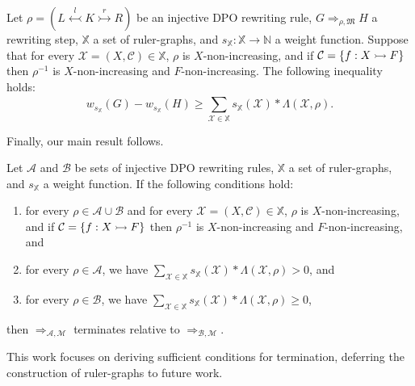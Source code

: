 \begin{lemma}
    \label{antipattern:lem:w_g_geq_w_h_leq}
    Let $\rho \mathop{=} (L \overset{l}{\leftarrowtail} K \overset{r}{\rightarrowtail} R)$ be an injective DPO rewriting rule, \( G \mathop{\Rightarrow}_{\rho,\mathfrak{M}} H \) a rewriting step,
    \( \mathbb{X} \) a set of ruler-graphs,
    and \( s_{\mathbb{X}} \mathop{\colon} \mathbb{X} \mathop{\to} \mathbb{N} \) a weight function. 
    Suppose that for every \( \mathcal{X}=(X,\mathcal{C}) \mathop{\in} \mathbb{X} \), 
    $\rho$ is $X$-non-increasing, and if $\mathcal{C}= \{f:X \rightarrowtail F\}$ then $\rho^{-1}$ is $X$-non-increasing and $F$-non-increasing. The following inequality holds:
     $$
        w_{s_\mathbb{X}}(G) \mathop{-} w_{s_\mathbb{X}}(H) 
        \mathop{\geq} 
        \sum_{\mathcal{X} \mathop{\in} \mathbb{X}}^{}s_\mathbb{X}(\mathcal{X}) \mathop{*} \Lambda(\mathcal{X},\rho).
    $$
\end{lemma}
Finally, our main result follows.
\begin{theorem}[Termination] 
    \label{antipattern:thm:termination_grs} 
    Let \(\mathcal{A}\) and \(\mathcal{B}\) be sets of injective DPO rewriting rules, $\mathbb{X}$ a set of ruler-graphs, and $s_\mathbb{X}$ a weight function. If the following conditions hold:
    \begin{enumerate}
        \item  for every $\rho \mathop{\in} \mathcal{A} \mathop{\cup} \mathcal{B}$ and for every \( \mathcal{X} = (X, \mathcal{C}) \mathop{\in} \mathbb{X} \), 
        $\rho$ is $X$-non-increasing, and if $\mathcal{C}= \{f:X \rightarrowtail F\}$ then $\rho^{-1}$ is $X$-non-increasing and $F$-non-increasing, and
        \item for every \(\rho \mathop{\in} \mathcal{A}\), we have
        $ \sum_{\mathcal{X} \mathop{\in} \mathbb{X}}^{}s_\mathbb{X}(\mathcal{X}) \mathop{*} 
            \Lambda(\mathcal{X},\rho) \mathop{>} 0 $, and
        \item for every \(\rho \mathop{\in} \mathcal{B}\), we have   
        $ 
            \sum_{\mathcal{X} \mathop{\in} \mathbb{X}}^{}s_\mathbb{X}(\mathcal{X}) \mathop{*} \Lambda(\mathcal{X},\rho) \mathop{\geq} 0 
        $,
    \end{enumerate}
    then \(\mathop{\Rightarrow}_{\mathcal{A},\mathcal{M}}\) terminates relative to \(\mathop{\Rightarrow}_{\mathcal{B},\mathcal{M}}\).
\end{theorem}
\begin{remark}
    This work focuses on deriving sufficient conditions for termination, deferring the construction of ruler-graphs to future work.
\end{remark} 
